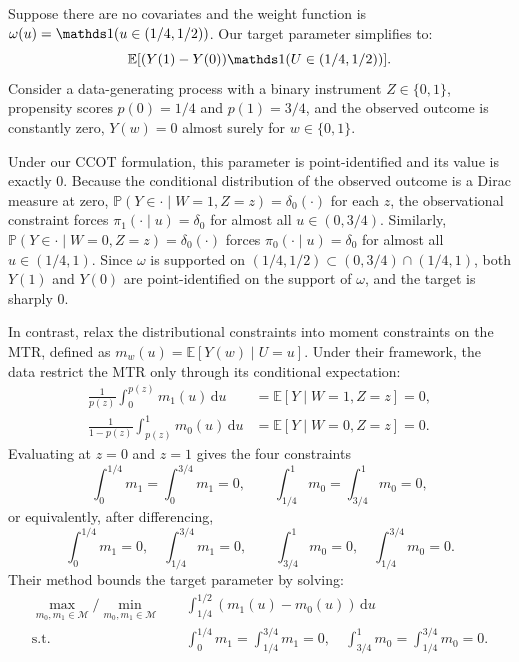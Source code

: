 \begin{example} \label{exp:loose_bd}
    Suppose there are no covariates and the weight function is $\omega(u) = \indicator(u \in (1/4, 1/2))$. Our target parameter simplifies to:
    \begin{equation*}
        \mathbb{E}[(Y(1) - Y(0)) \indicator(U \in (1/4, 1/2))].
    \end{equation*}
    Consider a data-generating process with a binary instrument $Z \in \{0,1\}$, propensity scores $p(0) = 1/4$ and $p(1) = 3/4$, and the observed outcome is constantly zero, $Y(w) = 0$ almost surely for $w \in \{0,1\}$.

    Under our CCOT formulation, this parameter is point-identified and its value is exactly $0$. Because the conditional distribution of the observed outcome is a Dirac measure at zero, $\mathbb{P}(Y \in \cdot \mid W=1, Z=z) = \delta_0(\cdot)$ for each $z$, the observational constraint forces $\pi_{1}(\cdot \mid u) = \delta_0$ for almost all $u \in (0, 3/4)$. Similarly, $\mathbb{P}(Y \in \cdot \mid W=0, Z=z) = \delta_0(\cdot)$ forces $\pi_0(\cdot \mid u) = \delta_0$ for almost all $u \in (1/4, 1)$. Since $\omega$ is supported on $(1/4, 1/2) \subset (0, 3/4) \cap (1/4, 1)$, both $Y(1)$ and $Y(0)$ are point-identified on the support of $\omega$, and the target is sharply $0$.

    In contrast, \citet{magne2018using} relax the distributional constraints into moment constraints on the MTR, defined as $m_w(u) = \mathbb{E}[Y(w) \mid U=u]$. Under their framework, the data restrict the MTR only through its conditional expectation:
    \begin{align*}
        \frac{1}{p(z)} \int_{0}^{p(z)} m_1(u) \, \mathrm{d}u &= \mathbb{E}[Y \mid W=1, Z=z] = 0, \\
        \frac{1}{1-p(z)} \int_{p(z)}^{1} m_0(u) \, \mathrm{d}u &= \mathbb{E}[Y \mid W=0, Z=z] = 0.
    \end{align*}
    Evaluating at $z=0$ and $z=1$ gives the four constraints
    \begin{equation*}
        \int_{0}^{1/4} m_1 = \int_{0}^{3/4} m_1 = 0, \qquad \int_{1/4}^{1} m_0 = \int_{3/4}^{1} m_0 = 0,
    \end{equation*}
    or equivalently, after differencing,
    \begin{equation*}
        \int_{0}^{1/4} m_1 = 0, \quad \int_{1/4}^{3/4} m_1 = 0, \qquad \int_{3/4}^{1} m_0 = 0, \quad \int_{1/4}^{3/4} m_0 = 0.
    \end{equation*}
    Their method bounds the target parameter by solving:
    \begin{equation*}
        \begin{split}
            \max_{m_0,m_1 \in \mathcal{M}} / \min_{m_0,m_1 \in \mathcal{M}} \quad & \int_{1/4}^{1/2} (m_1(u) - m_0(u)) \, \mathrm{d}u \\
            \text{s.t.} \quad & \int_{0}^{1/4} m_1 = \int_{1/4}^{3/4} m_1 = 0, \quad \int_{3/4}^{1} m_0 = \int_{1/4}^{3/4} m_0 = 0.
        \end{split}
    \end{equation*}


\end{example}
